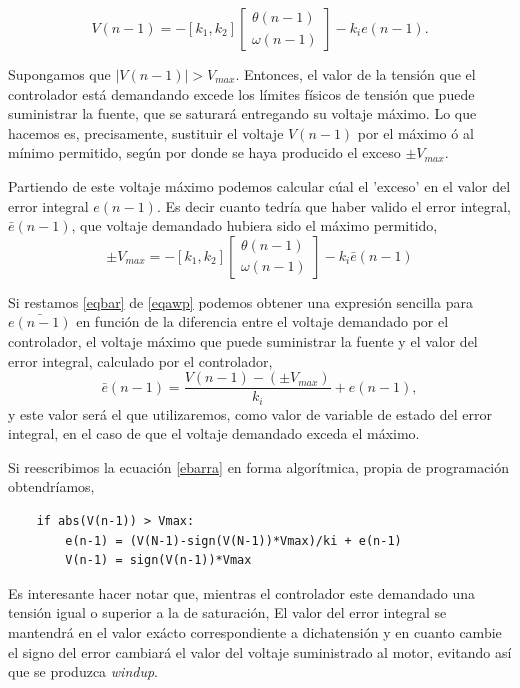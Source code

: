 \documentclass[10pt,a4paper]{report}
\begin{document}
\begin{equation}\label{eqawp}
	V(n-1) = -[k_1,k_2]\begin{bmatrix}
	\theta(n-1)\\
	\omega(n-1)
	\end{bmatrix}- k_ie(n-1).
\end{equation}

Supongamos que $|V(n-1)| > V_{max}$. Entonces, el valor de la tensión que el controlador está demandando excede los límites físicos de tensión que puede suministrar la fuente, que se saturará entregando su voltaje máximo. Lo que hacemos es, precisamente, sustituir el voltaje $V(n-1)$ por el máximo ó al mínimo permitido, según por donde se haya producido el exceso $\pm V_{max}$.

Partiendo de este voltaje máximo podemos calcular cúal el 'exceso' en el valor del error integral $e(n-1)$. Es decir cuanto tedría  que haber valido el error integral, $\bar{e}(n-1)$, que voltaje demandado hubiera sido el máximo permitido, 
\begin{equation}\label{eqbar}
\pm V_{max} =  -[k_1,k_2]\begin{bmatrix}
	\theta(n-1)\\
	\omega(n-1)
	\end{bmatrix} -k_i\bar{e}(n-1)
\end{equation}

Si restamos  \ref{eqbar} de \ref{eqawp} podemos obtener una expresión sencilla para $\bar{e(n-1)}$ en función de la diferencia entre el voltaje demandado por el controlador, el voltaje máximo que puede suministrar la fuente y el valor del error integral, calculado por el controlador,
\begin{equation}\label{ebarra}
	\bar{e}(n-1) = \frac{V(n-1)-(\pm V_{max})}{k_i} + e(n-1),
\end{equation}
y este valor será el que utilizaremos, como valor de variable de estado del error integral, en el caso de que el voltaje demandado exceda el máximo. 

Si reescribimos la ecuación \ref{ebarra} en forma algorítmica, propia de programación obtendríamos,
\begin{verbatim}
	if abs(V(n-1)) > Vmax:
		e(n-1) = (V(N-1)-sign(V(N-1))*Vmax)/ki + e(n-1)
		V(n-1) = sign(V(n-1))*Vmax
\end{verbatim}

Es interesante hacer notar que, mientras el controlador este demandado una tensión igual o superior a la de saturación, El valor del error integral se mantendrá en el valor exácto correspondiente a dichatensión y en cuanto cambie el signo del error cambiará el valor del voltaje suministrado al motor, evitando así que se produzca \emph{windup}.
\end{document}
